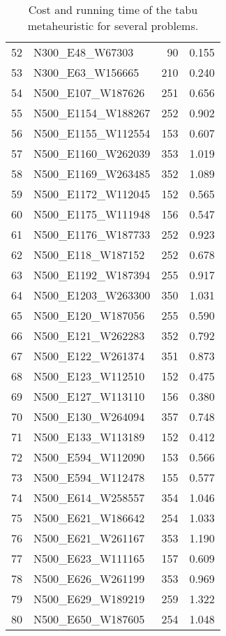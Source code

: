 \begin{table}
\begin{tabular}{llrr}
52 &     N300\_E48\_W67303 &    90 &             0.155 \\
53 &    N300\_E63\_W156665 &   210 &             0.240 \\
54 &   N500\_E107\_W187626 &   251 &             0.656 \\
55 &  N500\_E1154\_W188267 &   252 &             0.902 \\
56 &  N500\_E1155\_W112554 &   153 &             0.607 \\
57 &  N500\_E1160\_W262039 &   353 &             1.019 \\
58 &  N500\_E1169\_W263485 &   352 &             1.089 \\
59 &  N500\_E1172\_W112045 &   152 &             0.565 \\
60 &  N500\_E1175\_W111948 &   156 &             0.547 \\
61 &  N500\_E1176\_W187733 &   252 &             0.923 \\
62 &   N500\_E118\_W187152 &   252 &             0.678 \\
63 &  N500\_E1192\_W187394 &   255 &             0.917 \\
64 &  N500\_E1203\_W263300 &   350 &             1.031 \\
65 &   N500\_E120\_W187056 &   255 &             0.590 \\
66 &   N500\_E121\_W262283 &   352 &             0.792 \\
67 &   N500\_E122\_W261374 &   351 &             0.873 \\
68 &   N500\_E123\_W112510 &   152 &             0.475 \\
69 &   N500\_E127\_W113110 &   156 &             0.380 \\
70 &   N500\_E130\_W264094 &   357 &             0.748 \\
71 &   N500\_E133\_W113189 &   152 &             0.412 \\
72 &   N500\_E594\_W112090 &   153 &             0.566 \\
73 &   N500\_E594\_W112478 &   155 &             0.577 \\
74 &   N500\_E614\_W258557 &   354 &             1.046 \\
75 &   N500\_E621\_W186642 &   254 &             1.033 \\
76 &   N500\_E621\_W261167 &   353 &             1.190 \\
77 &   N500\_E623\_W111165 &   157 &             0.609 \\
78 &   N500\_E626\_W261199 &   353 &             0.969 \\
79 &   N500\_E629\_W189219 &   259 &             1.322 \\
80 &   N500\_E650\_W187605 &   254 &             1.048 \\
\bottomrule
\end{tabular}
\caption{Cost and running time of the tabu metaheuristic for several problems.}
\label{table:tabu-results}
\end{table}

